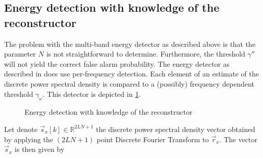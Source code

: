 \documentclass[a4paper, openany, oneside]{memoir}
\begin{document}
\subsection{Energy detection with knowledge of the reconstructor}
The problem with the multi-band energy detector as described above is that the parameter $N$ is not straightforward to determine. Furthermore, the threshold $\gamma''$ will not yield the correct false alarm probability. The energy detector as described in \cite{ariananda2012compressive} does use per-frequency detection. Each element of an estimate of the discrete power spectral density is compared to a (possibly) frequency dependent threshold $\gamma_{\omega}$. This detector is depicted in \cref{tkz:ed_ari_overview}.  

\begin{figure}[H]
\centering
{}
\caption{Energy detection with knowledge of the reconstructor}\label{tkz:ed_ari_overview}
\end{figure}

Let denote $\vec{s}_x[k] \in \mathbb{R}^{2LN+1}$ the discrete power spectral density vector obtained by applying the $(2LN+1)$ point Discrete Fourier Transform to $\vec{r}_x$. The vector $\vec{s}_x$ is then given by
\end{document}
